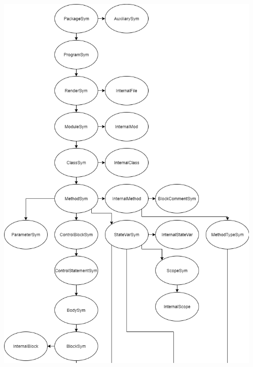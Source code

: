 \documentclass{beamer}
\begin{document}
\begin{frame}
\begin{columns}
\begin{column}{0.5\textwidth}
\includegraphics[scale=0.28]{GOOLClasses_top.png}
\end{column}
\begin{column}{0.5\textwidth}

\end{column}
\end{columns}
\end{frame}
\end{document}
